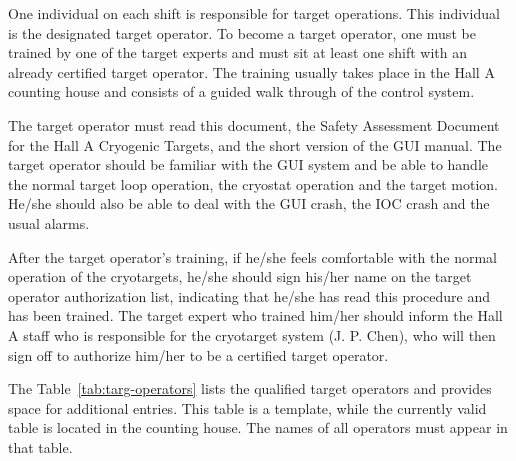 One individual on each shift is responsible for target operations. 
This individual
is the designated target operator. To become a target operator, 
one must be trained by one of the target experts and must sit at least
one shift with an already certified target operator. The training usually 
takes place in the Hall A counting house and consists of a guided walk 
through of the control system. 
\par
The target operator must read this document,
the Safety Assessment Document for the Hall A Cryogenic Targets,
and the short version of the GUI manual. The target operator should
be familiar with the GUI system and be able to handle the normal target
loop operation, the cryostat operation and the target motion. 
He/she should also be able to deal with the GUI crash, the IOC crash
and the usual alarms.
\par
After the target operator's training, if he/she feels comfortable
with the normal operation of the cryotargets, he/she should sign
his/her name on the target operator authorization list, indicating that
he/she has read this procedure and has been trained. The target expert
who trained him/her should inform the Hall A staff who is responsible 
for the cryotarget system (J. P. Chen), who will then sign off to authorize
him/her to be a certified target operator. 
\par
The Table~\ref{tab:targ-operators} lists the qualified target operators and provides space 
for additional entries. This table is a template, while the currently valid
table is located in the counting house.
The names of all operators must appear in that table.

\vspace{0.3cm}


